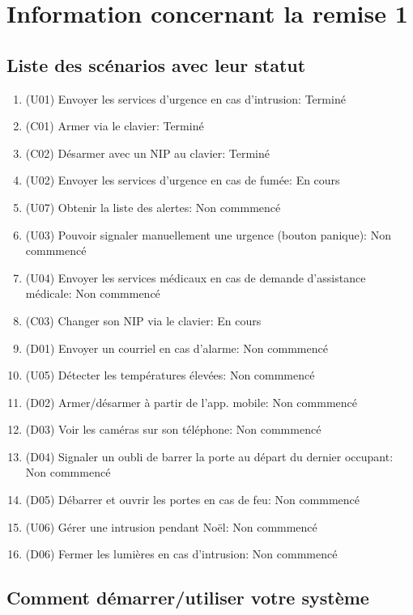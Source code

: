 
\chapter*{Information concernant la remise 1}

\section*{Liste des scénarios avec leur statut}
\begin{enumerate}
	\item (U01) Envoyer les services d'urgence en cas d'intrusion: Terminé
	\item (C01) Armer via le clavier: Terminé
	\item (C02) Désarmer avec un NIP au clavier: Terminé
	\item (U02) Envoyer les services d'urgence en cas de fumée: En cours
	\item (U07) Obtenir la liste des alertes: Non commmencé
	\item (U03) Pouvoir signaler manuellement une urgence (bouton panique): Non commmencé
	\item (U04) Envoyer les services médicaux en cas de demande d'assistance médicale: Non commmencé
	\item (C03) Changer son NIP via le clavier: En cours
	\item (D01) Envoyer un courriel en cas d'alarme: Non commmencé
	\item (U05) Détecter les températures élevées: Non commmencé
	\item (D02) Armer/désarmer à partir de l'app. mobile: Non commmencé
	\item (D03) Voir les caméras sur son téléphone: Non commmencé
	\item (D04) Signaler un oubli de barrer la porte au départ du dernier occupant: Non commmencé
	\item (D05) Débarrer et ouvrir les portes en cas de feu: Non commmencé
	\item (U06) Gérer une intrusion pendant Noël: Non commmencé
	\item (D06) Fermer les lumières en cas d'intrusion: Non commmencé
\end{enumerate}

\section*{Comment démarrer/utiliser votre système}

